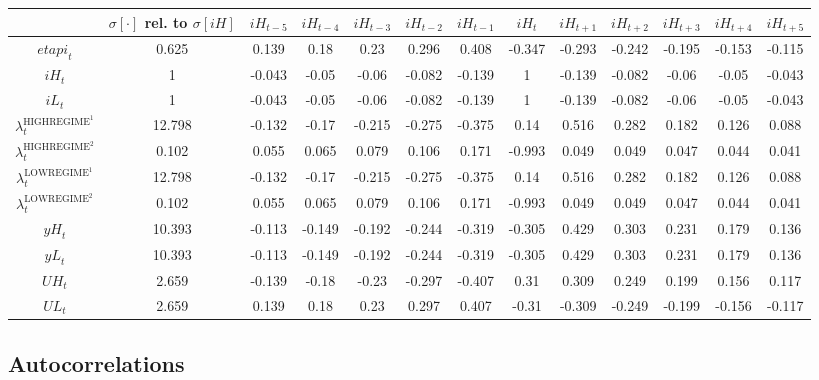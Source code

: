 \begin{tabular}{c|c|c|c|c|c|c|c|c|c|c|c|c|}
  & $\sigma[\cdot]$ rel. to $\sigma[{i\!H}]$ & ${i\!H}_{t-5}$ & ${i\!H}_{t-4}$ & ${i\!H}_{t-3}$ & ${i\!H}_{t-2}$ & ${i\!H}_{t-1}$ & ${i\!H}_{t}$ & ${i\!H}_{t+1}$ & ${i\!H}_{t+2}$ & ${i\!H}_{t+3}$ & ${i\!H}_{t+4}$ & ${i\!H}_{t+5}$\\
\hline
${e\!t\!a\!p\!i}_{t}$ & 0.625 & 0.139 & 0.18 & 0.23 & 0.296 & 0.408 & -0.347 & -0.293 & -0.242 & -0.195 & -0.153 & -0.115 \\
${i\!H}_{t}$ & 1 & -0.043 & -0.05 & -0.06 & -0.082 & -0.139 & 1 & -0.139 & -0.082 & -0.06 & -0.05 & -0.043 \\
${i\!L}_{t}$ & 1 & -0.043 & -0.05 & -0.06 & -0.082 & -0.139 & 1 & -0.139 & -0.082 & -0.06 & -0.05 & -0.043 \\
$\lambda^{\mathrm{HIGHREGIME}^{\mathrm{1}}}_{t}$ & 12.798 & -0.132 & -0.17 & -0.215 & -0.275 & -0.375 & 0.14 & 0.516 & 0.282 & 0.182 & 0.126 & 0.088 \\
$\lambda^{\mathrm{HIGHREGIME}^{\mathrm{2}}}_{t}$ & 0.102 & 0.055 & 0.065 & 0.079 & 0.106 & 0.171 & -0.993 & 0.049 & 0.049 & 0.047 & 0.044 & 0.041 \\
$\lambda^{\mathrm{LOWREGIME}^{\mathrm{1}}}_{t}$ & 12.798 & -0.132 & -0.17 & -0.215 & -0.275 & -0.375 & 0.14 & 0.516 & 0.282 & 0.182 & 0.126 & 0.088 \\
$\lambda^{\mathrm{LOWREGIME}^{\mathrm{2}}}_{t}$ & 0.102 & 0.055 & 0.065 & 0.079 & 0.106 & 0.171 & -0.993 & 0.049 & 0.049 & 0.047 & 0.044 & 0.041 \\
${y\!H}_{t}$ & 10.393 & -0.113 & -0.149 & -0.192 & -0.244 & -0.319 & -0.305 & 0.429 & 0.303 & 0.231 & 0.179 & 0.136 \\
${y\!L}_{t}$ & 10.393 & -0.113 & -0.149 & -0.192 & -0.244 & -0.319 & -0.305 & 0.429 & 0.303 & 0.231 & 0.179 & 0.136 \\
${U\!H}_{t}$ & 2.659 & -0.139 & -0.18 & -0.23 & -0.297 & -0.407 & 0.31 & 0.309 & 0.249 & 0.199 & 0.156 & 0.117 \\
${U\!L}_{t}$ & 2.659 & 0.139 & 0.18 & 0.23 & 0.297 & 0.407 & -0.31 & -0.309 & -0.249 & -0.199 & -0.156 & -0.117 \\
\hline
\end{tabular}


\subsection{Autocorrelations}

